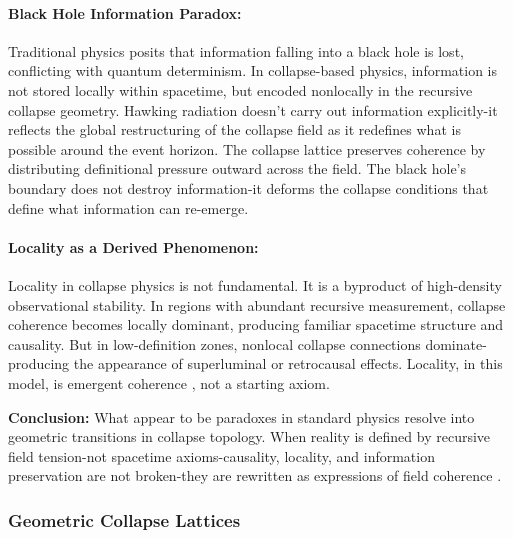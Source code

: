 \paragraph{Black Hole Information Paradox:} \cite{emergent_field_core, entanglement_structure, quantum_thermo_laws, thermalization_dynamics, blackhole_collapse_links}
Traditional physics posits that information falling into a black hole is lost, conflicting with quantum determinism. In collapse-based physics, information is not stored locally within spacetime, but encoded nonlocally in the recursive collapse geometry. Hawking radiation doesn’t carry out information explicitly-it reflects the global restructuring of the collapse field as it redefines what is possible around the event horizon. The collapse lattice preserves coherence by distributing definitional pressure outward across the field. The black hole’s boundary does not destroy information-it deforms the collapse conditions that define what information can re-emerge.

\paragraph{Locality as a Derived Phenomenon:} \cite{emergent_field_core, entanglement_structure, quantum_thermo_laws, thermalization_dynamics, blackhole_collapse_links}
Locality in collapse physics is not fundamental. It is a byproduct of high-density observational stability. In regions with abundant recursive measurement, collapse coherence becomes locally dominant, producing familiar spacetime structure and causality. But in low-definition zones, nonlocal collapse connections dominate-producing the appearance of superluminal or retrocausal effects. Locality, in this model, is  emergent coherence , not a starting axiom.

\textbf{Conclusion:} What appear to be paradoxes in standard physics resolve into geometric transitions in collapse topology. When reality is defined by recursive field tension-not spacetime axioms-causality, locality, and information preservation are not broken-they are rewritten as  expressions of field coherence . \cite{emergent_field_core, entanglement_structure, quantum_thermo_laws, thermalization_dynamics, blackhole_collapse_links}

\subsubsection{Geometric Collapse Lattices}\cite{emergent_field_core, entanglement_structure, quantum_thermo_laws, thermalization_dynamics, blackhole_collapse_links}

